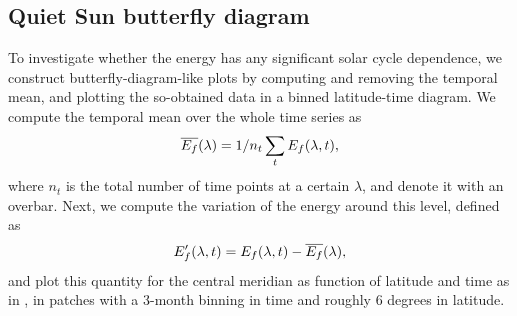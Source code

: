 \documentclass{aa}
\begin{document}


\subsection{Quiet Sun \fff butterfly diagram}\label{qsf}

To investigate whether the \fff energy has any significant solar cycle dependence, we construct butterfly-diagram-like plots by computing and removing the temporal mean, and plotting the so-obtained data in a binned latitude-time diagram. 
We compute the temporal mean over the whole time series as 
\begin{equation}
    \overline{E_f}(\lambda) = 1/n_t \sum_t E_f(\lambda,t),
\end{equation}
where $n_t$ is the total number of time points at a certain $\lambda$, and denote it with an overbar. Next, we compute the variation of the \fff energy around this level, defined as
\begin{equation}
    E_f'(\lambda,t)=E_f(\lambda,t)-\overline{E_f}(\lambda),
\end{equation}
and plot this quantity
for the central meridian
as function of latitude and time as in , 
in patches 
with a 3-month binning in time and roughly 6 degrees in latitude. 
\end{document}
